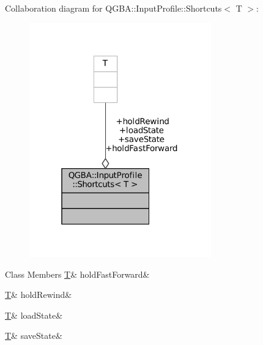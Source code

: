 Collaboration diagram for Q\+G\+BA\+:\+:Input\+Profile\+:\+:Shortcuts$<$ T $>$\+:
\nopagebreak
\begin{figure}[H]
\begin{center}
\leavevmode
\includegraphics[width=223pt]{struct_q_g_b_a_1_1_input_profile_1_1_shortcuts__coll__graph}
\end{center}
\end{figure}
\begin{DoxyFields}{Class Members}
\mbox{\label{class_q_g_b_a_1_1_input_profile_a16d5008560c1c865c62876d2eea67b8d}} 
\mbox{\hyperlink{_aes_8c_af6f2f773ebe19973d2b24c1b959affe6}{T}}&
holdFastForward&
\\
\hline

\mbox{\label{class_q_g_b_a_1_1_input_profile_aa2a27066255f748f5818034a836d6c0e}} 
\mbox{\hyperlink{_aes_8c_af6f2f773ebe19973d2b24c1b959affe6}{T}}&
holdRewind&
\\
\hline

\mbox{\label{class_q_g_b_a_1_1_input_profile_a4cb21ab9783ec215ed8fe85d76dfceb1}} 
\mbox{\hyperlink{_aes_8c_af6f2f773ebe19973d2b24c1b959affe6}{T}}&
loadState&
\\
\hline

\mbox{\label{class_q_g_b_a_1_1_input_profile_a26569af2765b310aec5cdf860348bba2}} 
\mbox{\hyperlink{_aes_8c_af6f2f773ebe19973d2b24c1b959affe6}{T}}&
saveState&
\\
\hline

\end{DoxyFields}


